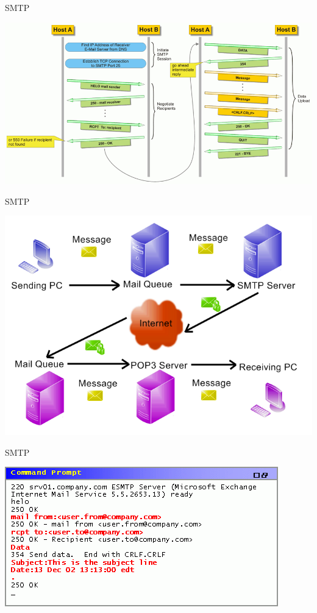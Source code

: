 \documentclass{beamer}
\begin{document}
\begin{frame}{SMTP}
\begin{center}
    \includegraphics[width=0.8\linewidth]{smtp}
\end{center}
\end{frame}

\begin{frame}{SMTP}
\begin{center}
    \includegraphics[width=0.7\linewidth]{smrp_queue}
\end{center}
\end{frame}

\begin{frame}{SMTP}
\begin{center}
    \includegraphics[width=0.7\linewidth]{smtp_shell}
\end{center}
\end{frame}
\end{document}
